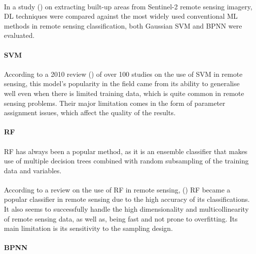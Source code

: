 \paragraph{}
In a study (\cite{isprs-archives-XLII-3-79-2018}) on extracting built-up areas from Sentinel-2 remote sensing imagery, \gls{DL} techniques were compared against the most widely used conventional \gls{ML} methods in remote sensing classification, both Gaussian \gls{SVM} and \gls{BPNN} were evaluated.

\paragraph{\gls{SVM}}
\paragraph{}
According to a 2010 review (\cite{MOUNTRAKIS2011247}) of over 100 studies on the use of \gls{SVM} in remote sensing, this model's popularity in the field came from its ability to generalise well even when there is limited training data, which is quite common in remote sensing problems. Their major limitation comes in the form of parameter assignment issues, which affect the quality of the results.

\paragraph{\gls{RF}}
\paragraph{}
\gls{RF} has always been a popular method, as it is an ensemble classifier that makes use of multiple decision trees combined with random subsampling of the training data and variables. 
\paragraph{}
According to a review on the use of \gls{RF} in remote sensing, (\cite{BELGIU201624}) \gls{RF} became a popular classifier in remote sensing due to the high accuracy of its classifications. It also seems to successfully handle the high dimensionality and multicollinearity of remote sensing data, as well as, being fast and not prone to overfitting. Its main limitation is its sensitivity to the sampling design.

\paragraph{\gls{BPNN}}

